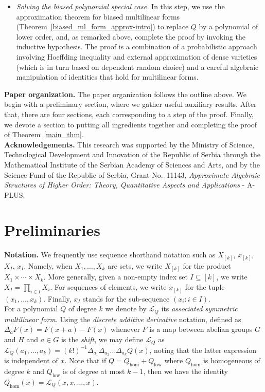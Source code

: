 \documentclass[a4paper,11pt]{article}
\theoremstyle{definition}
\newcommand{\on}[1]{
	\operatorname{#1}
}
\newcommand{\tdt}{\times\cdots\times}
\begin{document}
\begin{itemize}
    \item[\textbf{Step 4.}] \textit{Solving the biased polynomial special case.} In this step, we use the approximation theorem for biased multilinear forms (Theorem~\ref{biased_ml_form_approx-intro}) to replace $Q$ by a polynomial of lower order, and, as remarked above, complete the proof by invoking the inductive hypothesis. The proof is a combination of a probabilistic approach involving Hoeffding inequality and external approximation of dense varieties (which is in turn based on dependent random choice) and a careful algebraic manipulation of identities that hold for multilinear forms.
\end{itemize}

\noindent\textbf{Paper organization.} The paper organization follows the outline above. We begin with a preliminary section, where we gather useful auxiliary results. After that, there are four sections, each corresponding to a step of the proof. Finally, we devote a section to putting all ingredients together and completing the proof of Theorem~\ref{main_thm}.\\ 

\noindent\textbf{Acknowledgements.} This research was supported by the Ministry of Science, Technological Development and Innovation of the Republic of Serbia through the Mathematical Institute of the Serbian Academy of Sciences and Arts, and by the Science Fund of the Republic of Serbia, Grant No.\ 11143, \textit{Approximate Algebraic Structures of Higher Order: Theory, Quantitative Aspects and Applications} - A-PLUS.


\section{Preliminaries}

\noindent\textbf{Notation.} We frequently use sequence shorthand notation such as $X_{[k]}$, $x_{[k]}$, $X_I$, $x_I$. Namely, when $X_1, \dots, X_k$ are sets, we write $X_{[k]}$ for the product $X_1 \tdt X_k$. More generally, given a non-empty index set $I \subseteq [k]$, we write $X_I = \prod_{i \in I} X_i$. For sequences of elements, we write $x_{[k]}$ for the tuple $(x_1, \dots, x_k)$. Finally, $x_I$ stands for the sub-sequence $(x_i : i \in I)$.\\

For a polynomial $Q$ of degree $k$ we denote by $\mathcal{L}_Q$ its \textit{associated symmetric multilinear form}. Using the \textit{discrete additive derivative} notation, defined as $\Delta_a F(x) = F(x + a) - F(x)$ whenever $F$ is a map between abelian groups $G$ and $H$ and $a \in G$ is the \textit{shift}, we may define $\mathcal{L}_Q$ as $\mathcal{L}_Q(a_1, \dots, a_k) = (k!)^{-1}\Delta_{a_1} \Delta_{a_2} \dots \Delta_{a_k}Q(x)$, noting that the latter expression is independent of $x$. Note that if $Q = Q_{\on{hom}} + Q_{\on{low}}$ where $Q_{\on{hom}}$ is homogeneous of degree $k$ and $Q_{\on{low}}$ is of degree at most $k - 1$, then we have the identity $Q_{\on{hom}}(x) = \mathcal{L}_Q(x, x, \dots, x)$.\\
\end{document}
